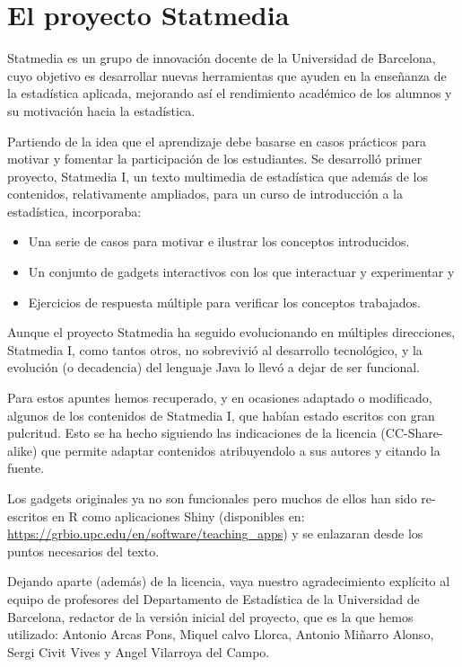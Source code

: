 \documentclass[
  a4paper,
  DIV=11,
  numbers=noendperiod]{scrreprt}
\providecommand{\tightlist}{%
  \setlength{\itemsep}{0pt}\setlength{\parskip}{0pt}}\usepackage{longtable,booktabs,array}
\begin{document}
\section*{El proyecto Statmedia}\label{el-proyecto-statmedia}


Statmedia es un grupo de innovación docente de la Universidad de
Barcelona, cuyo objetivo es desarrollar nuevas herramientas que ayuden
en la enseñanza de la estadística aplicada, mejorando así el rendimiento
académico de los alumnos y su motivación hacia la estadística.

Partiendo de la idea que el aprendizaje debe basarse en casos prácticos
para motivar y fomentar la participación de los estudiantes. Se
desarrolló primer proyecto, Statmedia I, un texto multimedia de
estadística que además de los contenidos, relativamente ampliados, para
un curso de introducción a la estadística, incorporaba:

\begin{itemize}
\tightlist
\item
  Una serie de casos para motivar e ilustrar los conceptos introducidos.
\item
  Un conjunto de gadgets interactivos con los que interactuar y
  experimentar y
\item
  Ejercicios de respuesta múltiple para verificar los conceptos
  trabajados.
\end{itemize}

Aunque el proyecto Statmedia ha seguido evolucionando en múltiples
direcciones, Statmedia I, como tantos otros, no sobrevivió al desarrollo
tecnológico, y la evolución (o decadencia) del lenguaje Java lo llevó a
dejar de ser funcional.

Para estos apuntes hemos recuperado, y en ocasiones adaptado o
modificado, algunos de los contenidos de Statmedia I, que habían estado
escritos con gran pulcritud. Esto se ha hecho siguiendo las indicaciones
de la licencia (CC-Share-alike) que permite adaptar contenidos
atribuyendolo a sus autores y citando la fuente.

Los gadgets originales ya no son funcionales pero muchos de ellos han
sido re-escritos en R como aplicaciones Shiny (disponibles en:
\url{https://grbio.upc.edu/en/software/teaching_apps}) y se enlazaran
desde los puntos necesarios del texto.

Dejando aparte (además) de la licencia, vaya nuestro agradecimiento
explícito al equipo de profesores del Departamento de Estadística de la
Universidad de Barcelona, redactor de la versión inicial del proyecto,
que es la que hemos utilizado: Antonio Arcas Pons, Miquel calvo Llorca,
Antonio Miñarro Alonso, Sergi Civit Vives y Angel Vilarroya del Campo.
\end{document}
